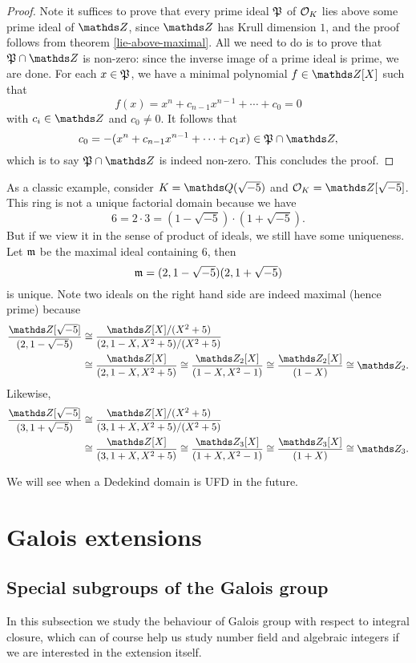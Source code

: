 			\begin{proof}
				Note it suffices to prove that every prime ideal $\mathfrak{P}$ of $\mathcal{O}_K$ lies above some prime ideal of $\Z$, since $\Z$ has Krull dimension $1$, and the proof follows from theorem \ref{lie-above-maximal}. All we need to do is to prove that $\mfk{P} \cap \Z$ is non-zero: since the inverse image of a prime ideal is prime, we are done. For each $x \in \mathfrak{P}$, we have a minimal polynomial $f \in \Z[X]$ such that
				\[
				f(x) = x^n+c_{n-1}x^{n-1}+\cdots+c_0=0
				\]
				with $c_i \in \Z$ and $c_0 \ne 0$. It follows that
				\[
				c_0=-(x^n+c_{n-1}x^{n-1}+\cdots+c_1x) \in \mfk{P} \cap \Z,
				\]
				which is to say $\mfk{P} \cap \Z$ is indeed non-zero. This concludes the proof.
			\end{proof}
			\begin{example}
				As a classic example, consider $K=\Q(\sqrt{-5})$ and $\OK = \Z[\sqrt{-5}]$. This ring is not a unique factorial domain because we have
				\[
				6 = 2 \cdot 3 = (1-\sqrt{-5}) \cdot (1+\sqrt{-5}).
				\]
				But if we view it in the sense of product of ideals, we still have some uniqueness. Let $\mathfrak{m}$ be the maximal ideal containing $6$, then
				\[
				\mathfrak{m} = (2,1-\sqrt{-5})(2,1+\sqrt{-5})
				\]
				is unique. Note two ideals on the right hand side are indeed maximal (hence prime) because
				\[
				\begin{aligned}
					\frac{\Z[\sqrt{-5}]}{(2,1-\sqrt{-5})} &\cong \frac{\Z[X]/(X^2+5)}{(2,1-X,X^2+5)/(X^2+5)} \\
					&\cong \frac{\Z[X]}{(2,1-X,X^2+5)} \cong \frac{\Z_2[X]}{(1-X,X^2-1)} \cong \frac{\Z_2[X]}{(1-X)} \cong \Z_2.
				\end{aligned}
				\]
				Likewise,
				\[
				\begin{aligned}
					\frac{\Z[\sqrt{-5}]}{(3,1+\sqrt{-5})} &\cong \frac{\Z[X]/(X^2+5)}{(3,1+X,X^2+5)/(X^2+5)} \\
					&\cong \frac{\Z[X]}{(3,1+X,X^2+5)} \cong \frac{\Z_3[X]}{(1+X,X^2-1)} \cong \frac{\Z_3[X]}{(1+X)} \cong \Z_3.
				\end{aligned}
				\]
			\end{example}
			We will see when a Dedekind domain is UFD in the future.
	\section{Galois extensions}
		\subsection{Special subgroups of the Galois group}
			In this subsection we study the behaviour of Galois group with respect to integral closure, which can of course help us study number field and algebraic integers if we are interested in the extension itself.
		
